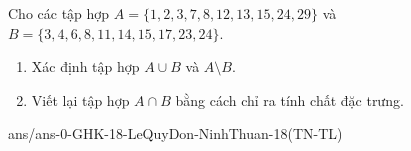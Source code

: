 \begin{bt}%
	Cho các tập hợp $A=\{1, 2, 3, 7, 8, 12, 13, 15, 24, 29\}$ và $B=\{3, 4, 6, 8, 11, 14, 15, 17, 23, 24\}$.
	\begin{enumerate}
		\item 	Xác định tập hợp $A\cup B$ và $A\setminus B$.
		\item 	Viết lại tập hợp $A\cap B$ bằng cách chỉ ra tính chất đặc trưng.
	\end{enumerate}
\end{bt}
	




\begin{indapan}{10}
{ans/ans-0-GHK-18-LeQuyDon-NinhThuan-18(TN-TL)}
\end{indapan}
